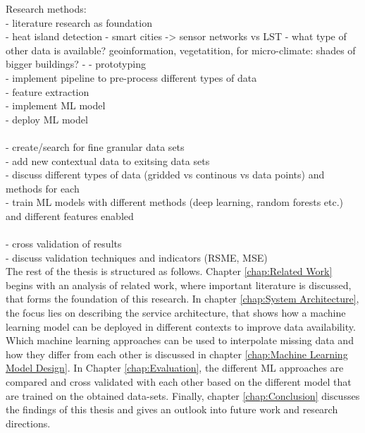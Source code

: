 Research methods:\\
- literature research as foundation\\
    - heat island detection
        - smart cities -> sensor networks vs LST
        - what type of other data is available? geoinformation, vegetatition, for micro-climate: shades of bigger buildings?
    - 
- prototyping\\
    - implement pipeline to pre-process different types of data\\
    - feature extraction\\
    - implement ML model\\
    - deploy ML model\\
\\
- create/search for fine granular data sets\\
    - add new contextual data to exitsing data sets\\
    - discuss different types of data (gridded vs continous vs data points) and methods for each
\\
- train ML models with different methods (deep learning, random forests etc.) and different features enabled\\
\\
- cross validation of results\\
    - discuss validation techniques and indicators (RSME, MSE)\\


The rest of the thesis is structured as follows. Chapter \ref{chap:Related Work} begins with an analysis of related work, where important literature is discussed, that forms the foundation of this research. In chapter \ref{chap:System Architecture}, the focus lies on describing the service architecture, that shows how a machine learning model can be deployed in different contexts to improve data availability. Which machine learning approaches can be used to interpolate missing data and how they differ from each other is discussed in chapter \ref{chap:Machine Learning Model Design}. In Chapter \ref{chap:Evaluation}, the different ML approaches are compared and cross validated with each other based on the different model that are trained on the obtained data-sets. Finally, chapter \ref{chap:Conclusion} discusses the findings of this thesis and gives an outlook into future work and research directions.
